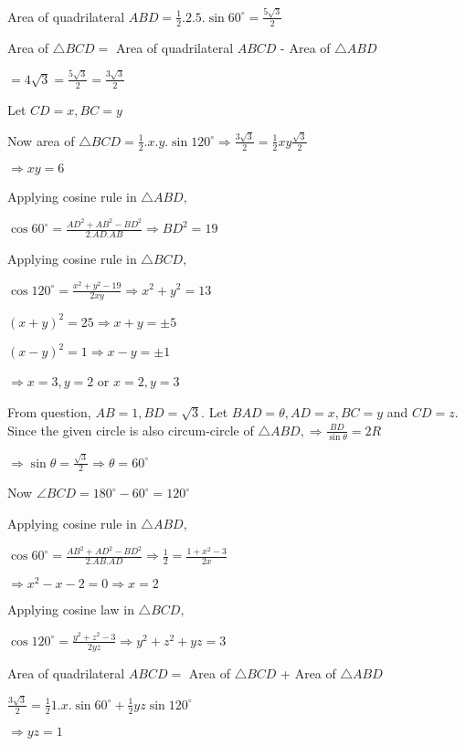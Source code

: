   Area of quadrilateral $ABD = \frac{1}{2}.2.5.\sin60^\circ = \frac{5\sqrt{3}}{2}$

  Area of $\triangle BCD =$ Area of quadrilateral $ABCD$ - Area of $\triangle ABD$

  $= 4\sqrt{3} = \frac{5\sqrt{3}}{2} = \frac{3\sqrt{3}}{2}$

  Let $CD = x, BC = y$

  Now area of $\triangle BCD = \frac{1}{2}.x.y.\sin120^\circ \Rightarrow \frac{3\sqrt{3}}{2} = \frac{1}{2}xy\frac{\sqrt{3}}{2}$

  $\Rightarrow xy = 6$

  Applying cosine rule in $\triangle ABD,$

  $\cos60^\circ = \frac{AD^2 + AB^2 - BD^2}{2.AD.AB} \Rightarrow BD^2 = 19$

  Applying cosine rule in $\triangle BCD,$

  $\cos120^\circ = \frac{x^2 + y^2 - 19}{2xy}\Rightarrow x^2 + y^2 = 13$

  $(x + y)^2 = 25 \Rightarrow x + y = \pm5$

  $(x - y)^2 = 1 \Rightarrow x - y = \pm1$

  $\Rightarrow x = 3, y = 2$ or $x = 2, y = 3$

\item From question, $AB = 1, BD = \sqrt{3}.$ Let $BAD=\theta, AD = x, BC = y$ and $CD = z.$ Since the given
  circle is also circum-circle of $\triangle ABD, \Rightarrow \frac{BD}{\sin\theta} = 2R$

  $\Rightarrow \sin\theta = \frac{\sqrt{3}}{2}\Rightarrow \theta = 60^\circ$

  Now $\angle BCD = 180^\circ - 60^\circ = 120^\circ$

  Applying cosine rule in $\triangle ABD,$

  $\cos60^\circ = \frac{AB^2 + AD^2 - BD^2}{2.AB.AD} \Rightarrow \frac{1}{2} = \frac{1 + x^2 - 3}{2x}$

  $\Rightarrow x^2 - x - 2 = 0 \Rightarrow x = 2$

  Applying cosine law in $\triangle BCD,$

  $\cos120^\circ = \frac{y^2 + z^2 - 3}{2yz} \Rightarrow y^2 + z^2 + yz = 3$

  Area of quadrilateral $ABCD =$ Area of $\triangle BCD$ + Area of $\triangle ABD$

  $\frac{3\sqrt{3}}{2} = \frac{1}{2}1.x.\sin60^\circ + \frac{1}{2}yz\sin 120^\circ$

  $\Rightarrow yz = 1$

